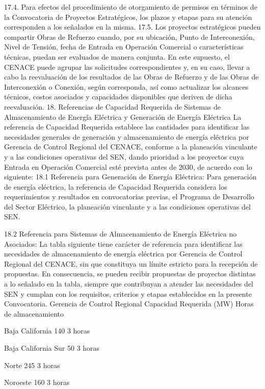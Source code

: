  
17.4. Para efectos del procedimiento de otorgamiento de permisos en términos de la Convocatoria de Proyectos Estratégicos, los plazos y etapas para su atención corresponden a los señalados en la misma.
17.5. Los proyectos estratégicos pueden compartir Obras de Refuerzo cuando, por su ubicación, Punto de Interconexión, Nivel de Tensión, fecha de Entrada en Operación Comercial o características técnicas, puedan ser evaluados de manera conjunta. En este supuesto, el CENACE puede agrupar las solicitudes correspondientes y, en su caso, llevar a cabo la reevaluación de los resultados de las Obras de Refuerzo y de las Obras de Interconexión o Conexión, según corresponda, así como actualizar los alcances técnicos, costos asociados y capacidades disponibles que deriven de dicha reevaluación.
18. Referencias de Capacidad Requerida de Sistemas de Almacenamiento de Energía Eléctrica y Generación de Energía Eléctrica
La referencia de Capacidad Requerida establece las cantidades para identificar las necesidades generales de generación y almacenamiento de energía eléctrica por Gerencia de Control Regional del CENACE, conforme a la planeación vinculante y a las condiciones operativas del SEN, dando prioridad a los proyectos cuya Entrada en Operación Comercial esté prevista antes de 2030, de acuerdo con lo siguiente:
18.1 Referencia para Generación de Energía Eléctrica:
Para generación de energía eléctrica, la referencia de Capacidad Requerida considera los requerimientos y resultados en convocatorias previas, el Programa de Desarrollo del Sector Eléctrico, la planeación vinculante y a las condiciones operativas del SEN.\par
18.2 Referencia para Sistemas de Almacenamiento de Energía Eléctrica no Asociados:
La tabla siguiente tiene carácter de referencia para identificar las necesidades de almacenamiento de energía eléctrica por Gerencia de Control Regional del CENACE, sin que constituya un límite estricto para la recepción de propuestas. En consecuencia, se pueden recibir propuestas de proyectos distintas a lo señalado en la tabla, siempre que contribuyan a atender las necesidades del SEN y cumplan con los requisitos, criterios y etapas establecidos en la presente Convocatoria.
Gerencia de Control Regional
 Capacidad Requerida (MW)
 Horas de almacenamiento
 
 Baja California
 140
 3 horas
 
 Baja California Sur
 50
 3 horas
 
 Norte
 245
 3 horas
 
 Noroeste
 160
 3 horas
 
